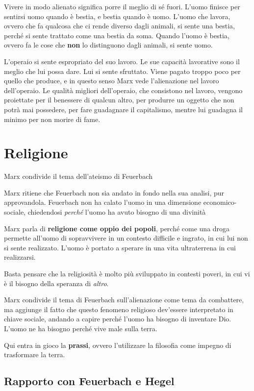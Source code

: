 \documentclass[a4paper, twoside, titlepage]{book}
\begin{document}
Vivere in modo alienato significa porre il meglio di sé fuori. L’uomo finisce per sentirsi uomo quando è bestia, e bestia quando è uomo.
L’uomo che lavora, ovvero che fa qualcosa che ci rende diverso dagli animali, si sente una bestia, perché si sente trattato come una bestia da soma.
Quando l’uomo è bestia, ovvero fa le cose che \textbf{non} lo distinguono dagli animali, si sente uomo.

L’operaio si sente espropriato del suo lavoro. Le sue capacità lavorative sono il meglio che lui possa dare. Lui si sente sfruttato. Viene pagato troppo poco per quello che produce, e in questo senso Marx vede l’alienazione nel lavoro dell’operaio.
Le qualità migliori dell’operaio, che consistono nel lavoro, vengono proiettate per il benessere di qualcun altro, per produrre un oggetto che non potrà mai possedere, per fare guadagnare il capitalismo, mentre lui guadagna il minimo per non morire di fame.

\chapter{Religione}

Marx condivide il tema dell’ateismo di Feuerbach

Marx ritiene che Feuerbach non sia andato in fondo nella sua analisi, pur approvandola. Feuerbach non ha calato l’uomo in una dimensione economico-sociale, chiedendosi \textit{perché} l’uomo ha avuto bisogno di una divinità

Marx parla di \textbf{religione come oppio dei popoli}, perché come una droga permette all’uomo di sopravvivere in un contesto difficile e ingrato, in cui lui non si sente realizzato.
L’uomo è portato a sperare in una vita ultraterrena in cui realizzarsi.

Basta pensare che la religiosità è molto più sviluppato in contesti poveri, in cui vi è il bisogno della speranza di \textit{altro}.

Marx condivide il tema di Feuerbach sull’alienazione come tema da combattere, ma aggiunge il fatto che questo fenomeno religioso dev’essere interpretato in chiave sociale, andando a capire perché l’uomo ha bisogno di inventare Dio.
L’uomo ne ha bisogno perché vive male sulla terra.

Qui entra in gioco la \textbf{prassi}, ovvero l’utilizzare la filosofia come impegno di trasformare la terra.

\section{Rapporto con Feuerbach e Hegel}
\end{document}
